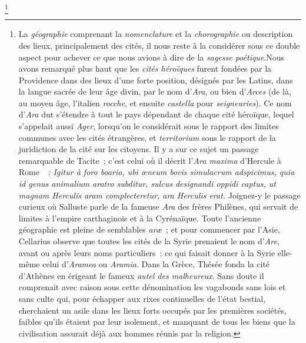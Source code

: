\documentclass[french,twoside]{book} %
\begin{document}
{}\footnote{\noindent La {\itshape géographie} comprenant la {\itshape nomenclature} et la {\itshape chorographie} ou description des lieux, principalement des cités, il nous reste à la considérer sous ce double aspect pour achever ce que nous avions à dire de la {\itshape sagesse poétique}.Nous avons remarqué plus haut que les {\itshape cités héroïques} furent fondées par la Providence dans des lieux d’une forte position, désignés par les Latins, dans la langue sacrée de leur âge divin, par le nom d’{\itshape Ara}, ou bien d’{\itshape Arces} (de là, au moyen âge, l’italien {\itshape rocche}, et ensuite {\itshape castella} pour {\itshape seigneuries}). Ce nom d’{\itshape Ara} dut s’étendre à tout le pays dépendant de chaque cité héroïque, lequel s’appelait aussi {\itshape Ager}, lorsqu’on le considérait sous le rapport des limites communes avec les cités étrangères, et {\itshape territorium} sous le rapport de la juridiction de la cité sur les citoyens. Il y a sur ce sujet un passage remarquable de Tacite ; c’est celui où il décrit l’{\itshape Ara maxima} d’Hercule à Rome \emph{{\itshape  : Igitur à foro boario, ubi œneum bovis simulacrum adspicimus, quia id genus animalium aratro subditur, sulcus designandi oppidi captus, ut magnam Herculis aram complecteretur, ara Herculis erat.}} Joignez-y le passage curieux où Salluste parle de la fameuse {\itshape Ara} des frères Philènes, qui servait de limites à l’empire carthaginois et à la Cyrénaïque. Toute l’ancienne géographie est pleine de semblables {\itshape aræ} ; et pour commencer par l’Asie, Cellarius observe que toutes les cités de la Syrie prenaient le nom d’{\itshape Are}, avant ou après leurs noms particuliers ; ce qui faisait donner à la Syrie elle-même celui d’{\itshape Aramea} ou {\itshape Aramia}. Dans la Grèce, Thésée fonda la cité d’Athènes en érigeant le fameux {\itshape autel des malheureux}. Sans doute il comprenait avec raison sous cette dénomination les vagabonds sans lois et sans culte qui, pour échapper aux rixes continuelles de l’état bestial, cherchaient un asile dans les lieux forts occupés par les premières sociétés, faibles qu’ils étaient par leur isolement, et manquant de tous les biens que la civilisation assurait déjà aux hommes réunis par la religion.\par
}
\end{document}
